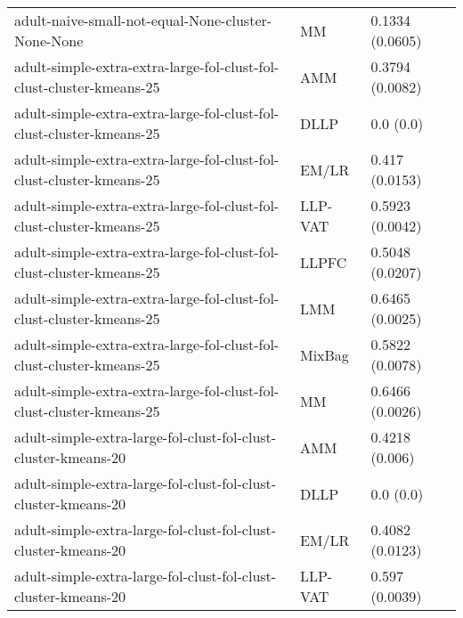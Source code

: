 \begin{longtable}{lll}
                                                           adult-naive-small-not-equal-None-cluster-None-None &        MM &                           0.1334 (0.0605) \\
                                         adult-simple-extra-extra-large-fol-clust-fol-clust-cluster-kmeans-25 &       AMM &                           0.3794 (0.0082) \\
                                         adult-simple-extra-extra-large-fol-clust-fol-clust-cluster-kmeans-25 &      DLLP &                                 0.0 (0.0) \\
                                         adult-simple-extra-extra-large-fol-clust-fol-clust-cluster-kmeans-25 &     EM/LR &                            0.417 (0.0153) \\
                                         adult-simple-extra-extra-large-fol-clust-fol-clust-cluster-kmeans-25 &   LLP-VAT &                           0.5923 (0.0042) \\
                                         adult-simple-extra-extra-large-fol-clust-fol-clust-cluster-kmeans-25 &     LLPFC &                           0.5048 (0.0207) \\
                                         adult-simple-extra-extra-large-fol-clust-fol-clust-cluster-kmeans-25 &       LMM &                           0.6465 (0.0025) \\
                                         adult-simple-extra-extra-large-fol-clust-fol-clust-cluster-kmeans-25 &    MixBag &                           0.5822 (0.0078) \\
                                         adult-simple-extra-extra-large-fol-clust-fol-clust-cluster-kmeans-25 &        MM &                           0.6466 (0.0026) \\
                                               adult-simple-extra-large-fol-clust-fol-clust-cluster-kmeans-20 &       AMM &                            0.4218 (0.006) \\
                                               adult-simple-extra-large-fol-clust-fol-clust-cluster-kmeans-20 &      DLLP &                                 0.0 (0.0) \\
                                               adult-simple-extra-large-fol-clust-fol-clust-cluster-kmeans-20 &     EM/LR &                           0.4082 (0.0123) \\
                                               adult-simple-extra-large-fol-clust-fol-clust-cluster-kmeans-20 &   LLP-VAT &                            0.597 (0.0039) \\

\end{longtable}
